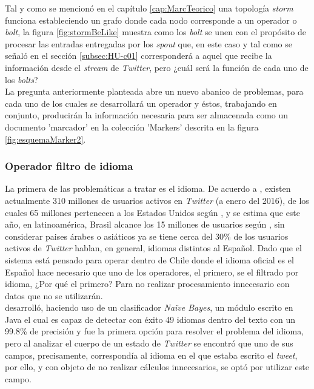 Tal y como se mencionó en el capítulo \ref{cap:MarcTeorico} una topología \textit{storm} funciona estableciendo un grafo donde cada nodo corresponde a un operador o \textit{bolt}, la figura \ref{fig:stormBeLike} muestra como los \textit{bolt} se unen con el propósito de procesar las entradas entregadas por los \textit{spout} que, en este caso y tal como se señaló en el sección \ref{subsec:HU-c01} corresponderá a aquel que recibe la información desde el \textit{stream} de \textit{Twitter}, pero ¿cuál será la función de cada uno de los \textit{bolts}?\\

La pregunta anteriormente planteada abre un nuevo abanico de problemas, para cada uno de los cuales se desarrollará un operador y éstos, trabajando en conjunto, producirán la información necesaria para ser almacenada como un documento 'marcador' en la colección 'Markers' descrita en la figura \ref{fig:esquemaMarker2}.

\subsubsection{Operador filtro de idioma}
\label{subsubsec:1op}

La primera de las problemáticas a tratar es el idioma. De acuerdo a \cite{TwitterActiveUsers}, existen actualmente 310 millones de usuarios activos en \textit{Twitter} (a enero del 2016), de los cuales 65 millones pertenecen a los Estados Unidos según \cite{TwitterStats1}, y se estima que este año, en latinoamérica, Brasil alcance los 15 millones de usuarios según \cite{TwitterStats2}, sin considerar paises árabes o asiáticos ya se tiene cerca del 30\% de los usuarios activos de \textit{Twitter} hablan, en general, idiomas distintos al Español. Dado que el sistema está pensado para operar dentro de Chile donde el idioma oficial es el Español hace necesario que uno de los operadores, el primero, se el filtrado por idioma, ¿Por qué el primero? Para no realizar procesamiento innecesario con datos que no se utilizarán.\\

\cite{languageDetector} desarrolló, haciendo uso de un clasificador \textit{Naïve Bayes}, un módulo escrito en Java el cual es capaz de detectar con éxito 49 idiomas dentro del texto con un 99.8\% de precisión y fue la primera opción para resolver el problema del idioma, pero al analizar el cuerpo de un estado de \textit{Twitter} se encontró que uno de sus campos, precisamente, correspondía al idioma en el que estaba escrito el \textit{tweet}, por ello, y con objeto de no realizar cálculos innecesarios, se optó por utilizar este campo.\\

